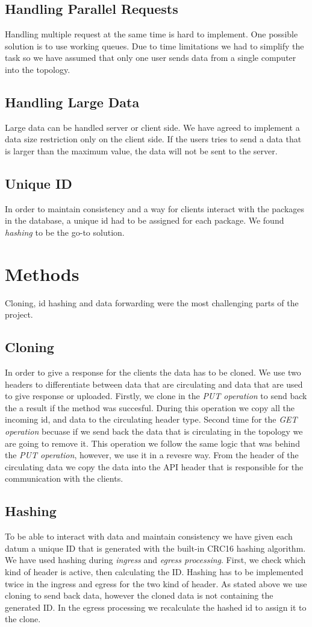 \documentclass[sigconf,natbib=false]{acmart}
\begin{document}
\subsection{Handling Parallel Requests}
Handling multiple request at the same time is hard to implement. One possible solution is to use working queues. Due to time limitations we had to simplify the task so we have assumed that only one user sends data from a single computer into the topology.
\subsection{Handling Large Data}
Large data can be handled server or client side. We have agreed to implement a data size restriction only on the client side. If the users tries to send a data that is larger than the maximum value, the data will not be sent to the server.
\subsection{Unique ID}
In order to maintain consistency and a way for clients interact with the packages in the database, a unique id had to be assigned for each package. We found \textit{hashing} to be the go-to solution.
\section{Methods}
Cloning, id hashing and data forwarding were the most challenging parts of the project.
\subsection{Cloning}
In order to give a response for the clients the data has to be cloned. We use two headers to differentiate between data that are circulating and data that are used to give response or uploaded. Firstly, we clone in the \textit{PUT operation} to send back the a result if the method was succesful. During this operation we copy all the incoming id, and data to the circulating header type. Second time for the \textit{GET operation} becuase if we send back the data that is circulating in the topology we are going to remove it. This operation we follow the same logic that was behind the \textit{PUT operation}, however, we use it in a revesre way. From the header of the circulating data we copy the data into the API header that is responsible for the communication with the clients.
\cite{cloning1} \cite{cloning2}
\subsection{Hashing}
To be able to interact with data and maintain consistency we have given each datum a unique ID that is generated with the built-in CRC16 hashing \cite{hashing2} algorithm. We have used hashing during \textit{ingress} and \textit{egress processing}. First, we check which kind of header is active, then calculating the ID. Hashing has to be implemented twice in the ingress and egress for the two kind of header. As stated above we use cloning to send back data, however the cloned data is not containing the generated ID. In the egress processing we recalculate the hashed id to assign it to the clone.
\cite{scholz2019cryptographic}
\end{document}

